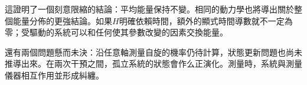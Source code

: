 這證明了一個刻意限縮的結論：平均能量保持不變。相同的動力學也將導出關於整個能量分佈的更強結論。如果\(H\)明確依賴時間，額外的顯式時間導數就不一定為零；受驅動的系統可以和任何使其參數改變的因素交換能量。

還有兩個問題懸而未決：沿任意軸測量自旋的機率仍待計算，狀態更新問題也尚未推導出來。在兩次干預之間，孤立系統的狀態會作么正演化。測量時，系統與測量儀器相互作用並形成糾纏。

\begin{classroomqa}
\end{classroomqa}

\begin{classroomqa}
\end{classroomqa}

